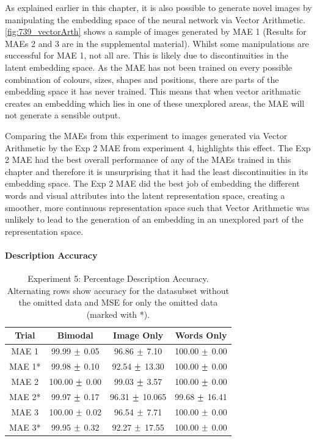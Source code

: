 As explained earlier in this chapter, it is also possible to generate novel images by manipulating the embedding space of the neural network via Vector Arithmetic. \autoref{fig:739_vectorArth} shows a sample of images generated by MAE 1 (Results for MAEs 2 and 3 are in the supplemental material). Whilst some manipulations are successful for MAE 1, not all are. This is likely due to discontinuities in the latent embedding space. As the MAE has not been trained on every possible combination of colours, sizes, shapes and positions, there are parts of the embedding space it has never trained. This means that when vector arithmatic creates an embedding which lies in one of these unexplored areas, the MAE will not generate a sensible output. 

Comparing the MAEs from this experiment to images generated via Vector Arithmetic by the Exp 2 MAE from experiment 4, highlights this effect. The Exp 2 MAE had the best overall performance of any of the MAEs trained in this chapter and therefore it is unsurprising that it had the least discontinuities in its embedding space. The Exp 2 MAE did the best job of embedding the different words and visual attributes into the latent representation space, creating a smoother, more continuous representation space such that Vector Arithmetic was unlikely to lead to the generation of an embedding in an unexplored part of the representation space. 

\paragraph{Description Accuracy}
\begin{table}[h!]
\centering
	\begin{tabular}{|c|c|c|c|}
	\hline
\textbf{Trial}	 & 	\textbf{Bimodal} & \textbf{Image Only} 	& 	\textbf{Words Only} \\ \hline
MAE 1	&	99.99	$\mypm$	0.05	&	96.86	$\mypm$	7.10	&	100.00	$\mypm$	0.00	\\ \hline
MAE 1*	&	99.98	$\mypm$	0.10	&	92.54	$\mypm$	13.30	&	100.00	$\mypm$	0.00	\\ \hline
MAE 2	&	100.00	$\mypm$	0.00	&	99.03	$\mypm$	3.57	&	100.00	$\mypm$	0.00	\\ \hline
MAE 2*	&	99.97	$\mypm$	0.17	&	96.31	$\mypm$	10.065	&	99.68	$\mypm$	16.41	\\ \hline
MAE 3	&	100.00	$\mypm$	0.02	&	96.54	$\mypm$	7.71	&	100.00	$\mypm$	0.00	\\ \hline

MAE 3*	&	99.95	$\mypm$	0.32	&	92.27	$\mypm$	17.55	&	100.00	$\mypm$	0.00	\\ \hline

	\end{tabular}
\caption{Experiment 5: Percentage Description Accuracy. Alternating rows show accuracy for the datasubset without the omitted data and MSE for only the omitted data (marked with *).}
\label{tab:res_exp5_acc}
\end{table}

